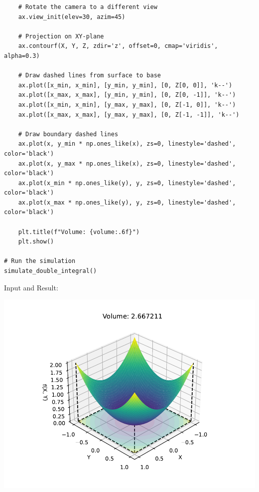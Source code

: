 \documentclass[13pt,a4paper]{report}
\begin{document}
\begin{verbatim}
    # Rotate the camera to a different view
    ax.view_init(elev=30, azim=45) 

    # Projection on XY-plane
    ax.contourf(X, Y, Z, zdir='z', offset=0, cmap='viridis', alpha=0.3)

    # Draw dashed lines from surface to base
    ax.plot([x_min, x_min], [y_min, y_min], [0, Z[0, 0]], 'k--')
    ax.plot([x_max, x_max], [y_min, y_min], [0, Z[0, -1]], 'k--')
    ax.plot([x_min, x_min], [y_max, y_max], [0, Z[-1, 0]], 'k--')
    ax.plot([x_max, x_max], [y_max, y_max], [0, Z[-1, -1]], 'k--')

    # Draw boundary dashed lines
    ax.plot(x, y_min * np.ones_like(x), zs=0, linestyle='dashed', color='black')
    ax.plot(x, y_max * np.ones_like(x), zs=0, linestyle='dashed', color='black')
    ax.plot(x_min * np.ones_like(y), y, zs=0, linestyle='dashed', color='black')
    ax.plot(x_max * np.ones_like(y), y, zs=0, linestyle='dashed', color='black')

    plt.title(f"Volume: {volume:.6f}")
    plt.show()

# Run the simulation
simulate_double_integral()
\end{verbatim}

Input and Result:\\[-0.35cm]
\begin{center}
\includegraphics[trim={0.5cm 1cm 0 0.35cm},clip]{pdfs/double_integral.pdf}
\end{center}
\end{document}
